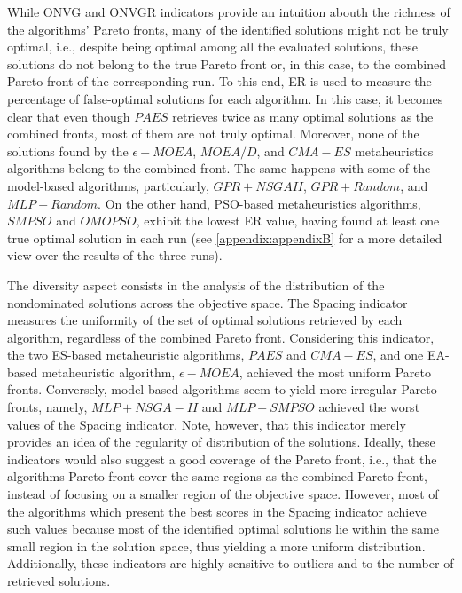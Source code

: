 While \ac{ONVG} and \ac{ONVGR} indicators provide an intuition abouth the richness of the algorithms' Pareto fronts, many of the identified solutions might not be truly optimal, i.e., despite being optimal among all the evaluated solutions, these solutions do not belong to the true Pareto front or, in this case, to the combined Pareto front of the corresponding run. To this end, \ac{ER} is used to measure the percentage of false-optimal solutions for each algorithm. In this case, it becomes clear that even though $PAES$ retrieves twice as many optimal solutions as the combined fronts, most of them are not truly optimal. Moreover, none of the solutions found by the $\epsilon-MOEA$, $MOEA/D$, and $CMA-ES$ metaheuristics algorithms belong to the combined front. The same happens with some of the model-based algorithms, particularly, $GPR+NSGAII$, $GPR+Random$, and $MLP+Random$. On the other hand, \ac{PSO}-based metaheuristics algorithms, $SMPSO$ and $OMOPSO$, exhibit the lowest \ac{ER} value, having found at least one true optimal solution in each run (see \cref{appendix:appendixB} for a more detailed view over the results of the three runs).

The diversity aspect consists in the analysis of the distribution of the nondominated solutions across the objective space. The Spacing indicator measures the uniformity of the set of optimal solutions retrieved by each algorithm, regardless of the combined Pareto front. Considering this indicator, the two \ac{ES}-based metaheuristic algorithms, $PAES$ and $CMA-ES$, and one \ac{EA}-based metaheuristic algorithm, $\epsilon-MOEA$, achieved the most uniform Pareto fronts. Conversely, model-based algorithms seem to yield more irregular Pareto fronts, namely, $MLP+NSGA-II$ and $MLP+SMPSO$ achieved the worst values of the Spacing indicator. Note, however, that this indicator merely provides an idea of the regularity of distribution of the solutions. Ideally, these indicators would also suggest a good coverage of the Pareto front, i.e., that the algorithms Pareto front cover the same regions as the combined Pareto front, instead of focusing on a smaller region of the objective space. However, most of the algorithms which present the best scores in the Spacing indicator achieve such values because most of the identified optimal solutions lie within the same small region in the solution space, thus yielding a more uniform distribution. Additionally, these indicators are highly sensitive to outliers and to the number of retrieved solutions. %

